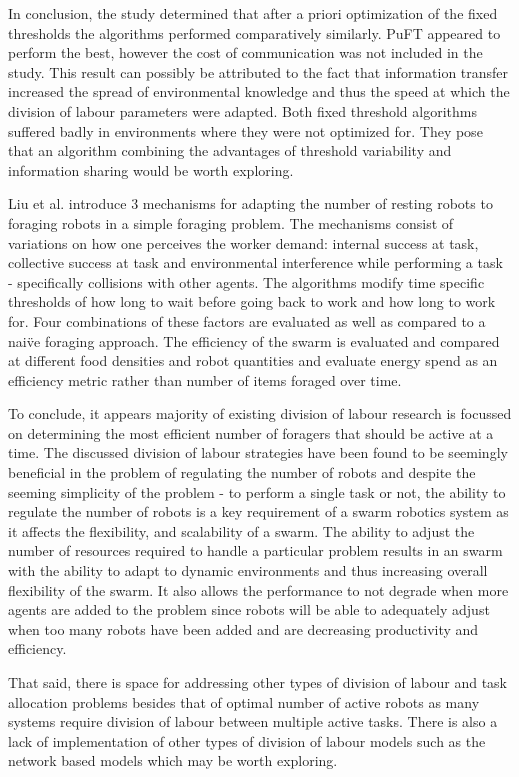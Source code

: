 In conclusion, the study determined that after a priori optimization of the fixed thresholds the algorithms performed comparatively similarly. PuFT appeared to perform the best, however the cost of communication was not included in the study. This result can possibly be attributed to the fact that information transfer increased the spread of environmental knowledge and thus the speed at which the division of labour parameters were adapted. Both fixed threshold algorithms suffered badly in environments where they were not optimized for. They pose that an algorithm combining the advantages of threshold variability and information sharing would be worth exploring. 

Liu et al. \cite{liu2007towards} introduce 3 mechanisms for adapting the number of resting robots to foraging robots in a simple foraging problem. The mechanisms consist of variations on how one perceives the worker demand: internal success at task, collective success at task and environmental interference while performing a task - specifically collisions with other agents. The algorithms modify time specific thresholds of how long to wait before going back to work and how long to work for. Four combinations of these factors are evaluated as well as compared to a nai\"ve foraging approach. The efficiency of the swarm is evaluated and compared at different food densities and robot quantities and evaluate energy spend as an efficiency metric rather than number of items foraged over time. %

To conclude, it appears majority of existing division of labour research is focussed on determining the most efficient number of foragers that should be active at a time. The discussed division of labour strategies have been found to be seemingly beneficial in the problem of regulating the number of robots and despite the seeming simplicity of the problem - to perform a single task or not, the ability to regulate the number of robots is a key requirement of a swarm robotics system as it affects the flexibility, and scalability of a swarm. The ability to adjust the number of resources required to handle a particular problem results in an swarm with the ability to adapt to dynamic environments and thus increasing overall flexibility of the swarm. It also allows the performance to not degrade when more agents are added to the problem since robots will be able to adequately adjust when too many robots have been added and are decreasing productivity and efficiency. 

That said, there is space for addressing other types of division of labour and task allocation problems besides that of optimal number of active robots as many systems require division of labour between multiple active tasks. There is also a lack of implementation of other types of division of labour models such as the network based models which may be worth exploring.

